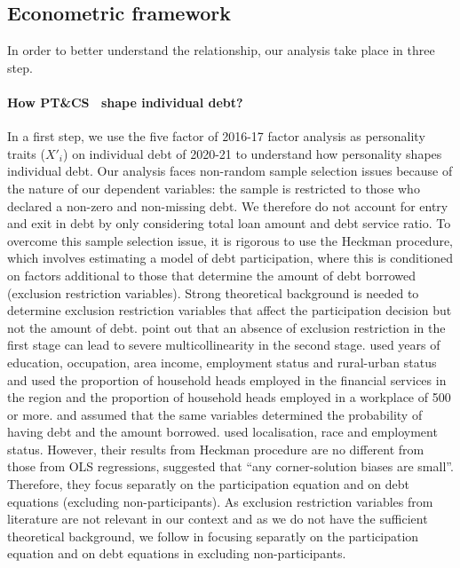 \documentclass[a4paper, 11pt, onecolumn]{article}
\newcommand{\PTCS}{PT\&CS}
\begin{document}
	\subsection{Econometric framework}
	\label{subsection:econometricframework}

In order to better understand the relationship, our analysis take place in three step.
\paragraph{How \PTCS~ shape individual debt?}
In a first step, we use the five factor of 2016-17 factor analysis as personality traits ($X'_{i}$) on individual debt of 2020-21 to understand how personality shapes individual debt.
Our analysis faces non-random sample selection issues because of the nature of our dependent variables: the sample is restricted to those who declared a non-zero and non-missing debt.
We therefore do not account for entry and exit in debt by only considering total loan amount and debt service ratio.
To overcome this sample selection issue, it is rigorous to use the Heckman procedure, which involves estimating a model of debt participation, where this is conditioned on factors additional to those that determine the amount of debt borrowed (exclusion restriction variables).
Strong theoretical background is needed to determine exclusion restriction variables that affect the participation decision but not the amount of debt.
\cite{Lennox2011} point out that an absence of exclusion restriction in the first stage can lead to severe multicollinearity in the second stage.
\cite{Cox1993} used years of education, occupation, area income, employment status and rural-urban status and \cite{Bertaut2002} used the proportion of household heads employed in the financial services in the region and the proportion of household heads employed in a workplace of 500 or more.
\cite{Duca1993} and \cite{Crook2001} assumed that the same variables determined the probability of having debt and the amount borrowed.
\cite{Rio2006} used localisation, race and employment status.
However, their results from Heckman procedure are no different from those from OLS regressions, suggested that ``any corner-solution biases are small''.
Therefore, they focus separatly on the participation equation and on debt equations (excluding non-participants).
As exclusion restriction variables from literature are not relevant in our context and as we do not have the sufficient theoretical background, we follow \cite{Rio2006} in focusing separatly on the participation equation and on debt equations in excluding non-participants.
\end{document}
